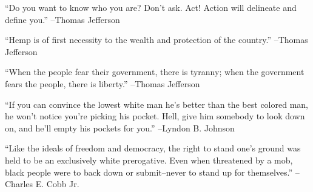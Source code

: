 \documentclass{article}%
\begin{document}
\linebreak%
\vspace{1mm}%
\begin{minipage}{\textwidth}%
\flushleft%
“Do you want to know who you are? Don't ask. Act! Action will delineate and define you.”%
\linebreak%
\vspace{1mm}%
–Thomas Jefferson%
\linebreak%
\vspace{1mm}%
\end{minipage}%
\linebreak%
\vspace{1mm}%
\begin{minipage}{\textwidth}%
\flushleft%
“Hemp is of first necessity to the wealth and protection of the country.”%
\linebreak%
\vspace{1mm}%
–Thomas Jefferson%
\linebreak%
\vspace{1mm}%
\end{minipage}%
\linebreak%
\vspace{1mm}%
\begin{minipage}{\textwidth}%
\flushleft%
“When the people fear their government, there is tyranny; when the government fears the people, there is liberty.”%
\linebreak%
\vspace{1mm}%
–Thomas Jefferson%
\linebreak%
\vspace{1mm}%
\end{minipage}%
\linebreak%
\vspace{1mm}%
\begin{minipage}{\textwidth}%
\flushleft%
“If you can convince the lowest white man he's better than the best colored man, he won't notice you're picking his pocket. Hell, give him somebody to look down on, and he'll empty his pockets for you.”%
\linebreak%
\vspace{1mm}%
–Lyndon B. Johnson%
\linebreak%
\vspace{1mm}%
\end{minipage}%
\linebreak%
\vspace{1mm}%
\begin{minipage}{\textwidth}%
\flushleft%
“Like the ideals of freedom and democracy, the right to stand one's ground was held to be an exclusively white prerogative. Even when threatened by a mob, black people were to back down or submit–never to stand up for themselves.”%
\linebreak%
\vspace{1mm}%
–Charles E. Cobb Jr.%
\linebreak%
\vspace{1mm}%
\end{minipage}%
\end{document}
